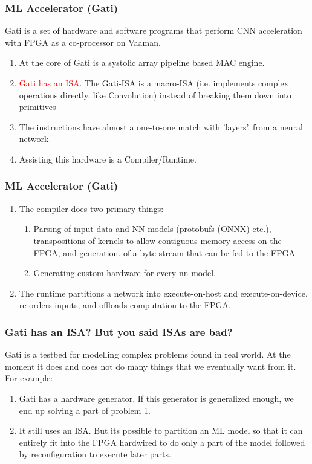 \documentclass{beamer}
\begin{document}
{\begin{frame}[fragile]
  \frametitle{ML Accelerator (Gati)}
  Gati is a set of hardware and software programs that perform CNN
  acceleration with FPGA as a co-processor on Vaaman.
  \begin{enumerate}
    \item At the core of Gati is a systolic array pipeline based MAC engine.
    \item \textcolor{red}{Gati has an ISA}. The Gati-ISA is a macro-ISA (i.e. implements complex operations directly.
      like Convolution) instead of breaking them down into primitives
    \item The instructions have almost a one-to-one match with 'layers'.
      from a neural network
    \item Assisting this hardware is a Compiler/Runtime.
  \end{enumerate}
\end{frame}

\begin{frame}[fragile]
  \frametitle{ML Accelerator (Gati)}
  \begin{enumerate}
    \item The compiler does two primary things:
      \begin{enumerate}
        \item Parsing of input data and NN models (protobufs (ONNX) etc.),
          transpositions of kernels to allow contiguous memory access on the 
          FPGA, and generation.
          of a byte stream that can be fed to the FPGA
        \item Generating custom hardware for every nn model.
      \end{enumerate}
    \item The runtime partitions a network into execute-on-host and
      execute-on-device, re-orders inputs, and offloads computation
      to the FPGA.
  \end{enumerate}
\end{frame}

\begin{frame}[fragile]
  \frametitle{Gati has an ISA? But you said ISAs are bad?}
  Gati is a testbed for modelling complex problems found in real world.
  At the moment it does and does not do many things that we eventually want
  from it.
  For example:
  \begin{enumerate}
    \item Gati has a hardware generator. If this generator is generalized
      enough, we end up solving a part of problem 1.
    \item It still uses an ISA. But its possible to partition an ML
      model so that it can entirely fit into 
      the FPGA hardwired to do only a part of the model followed by
      reconfiguration to execute later parts.
  \end{enumerate}
\end{frame}

}
\end{document}
